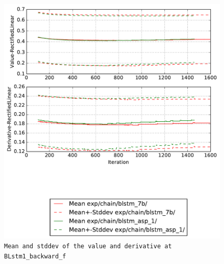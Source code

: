 \documentclass[prl,10pt,twocolumn]{revtex4}
\begin{document}
\newpage
\begin{figure}[h]
  \begin{center}
    \caption{\texttt{Mean and stddev of the value and derivative at BLstm1\_backward\_f}}
    \includegraphics[width=\textwidth]{exp/chain/blstm_7b/report/nonlinstats_BLstm1_backward_f.pdf}
  \end{center}
\end{figure}
\clearpage
\end{document}
